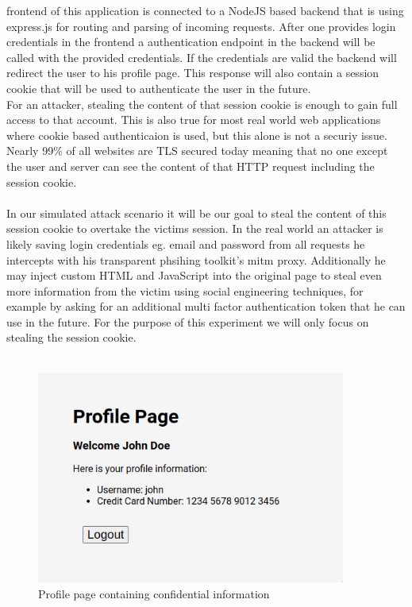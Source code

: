 \documentclass[12pt]{scrbook}
\begin{document}
frontend of this application is connected to a NodeJS based backend that is
using express.js for routing and parsing of incoming requests. After one
provides login credentials in the frontend a authentication endpoint in the
backend will be called with the provided credentials. If the credentials are
valid the backend will redirect the user to his profile page. This response will
also contain a session cookie that will be used to authenticate the user in the
future.\\For an attacker, stealing the content of that session cookie is enough
to gain full access to that account. This is also true for most real world web
applications where cookie based authenticaion is used, but this alone is not a
securiy issue. Nearly 99\% of all websites are TLS secured today
\cite{tlsPercentage} meaning that no one except the user and server can see the
content of that HTTP request including the session cookie.\\ \\

In our simulated attack scenario it will be our goal to steal the content of
this session cookie to overtake the victims session. In the real world an
attacker is likely saving login credentials eg. email and password from all
requests he intercepts with his transparent phsihing toolkit's mitm proxy.
Additionally he may inject custom HTML and JavaScript into the original page to
steal even more information from the victim using social engineering techniques,
for example by asking for an additional multi factor authentication token that
he can use in the future. For the purpose of this experiment we will only focus
on stealing the session cookie.\\ \\

\begin{figure}[!htb] \centering
\includegraphics[height=7cm]{./images/profile_page.png} \caption{Profile page
containing confidential information} \end{figure}
\end{document}
